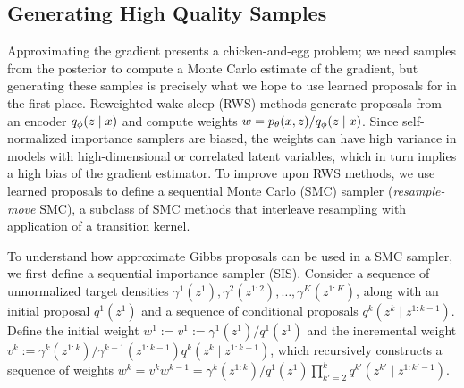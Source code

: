 \documentclass[anonymous=false, %
               format=acmsmall, %
               review=true, %
               screen=true, %
               nonacm=true]{acmart}
\theoremstyle{definition}
\begin{document}
\subsection{Generating High Quality Samples}
Approximating the gradient presents a chicken-and-egg problem; we need samples from the posterior to compute a Monte Carlo estimate of the gradient, but generating these samples is precisely what we hope to use learned proposals for in the first place. 
Reweighted wake-sleep (RWS) methods \cite{le2019revisiting} generate proposals from an encoder $q_\phi(z \mid x)$ and compute weights $w = p_\theta(x, z) / q_\phi(z \mid x)$. Since self-normalized importance samplers are biased, the weights can have high variance in models with high-dimensional or correlated latent variables, which in turn implies a high bias of the gradient estimator. To improve upon RWS methods, we use learned proposals to define a sequential Monte Carlo (SMC) sampler \cite{delmoral2006sequential} (\emph{resample-move} SMC), a subclass of SMC methods \cite{doucet2001sequential} that interleave resampling with application of a transition kernel.


To understand how approximate Gibbs proposals can be used in a SMC sampler, we first define a sequential importance sampler (SIS). Consider a sequence of unnormalized target densities $\gamma^1(z^1), \gamma^2(z^{1:2}), \dots, \gamma^K(z^{1:K})$, along with an initial proposal $q^1(z^1)$ and a sequence of conditional proposals $q^k(z^k \mid z^{1:k-1})$. Define the initial weight $w^1 := v^1 := \gamma^1(z^1) / q^1(z^1)$ and the incremental weight $v^k:=  \gamma^k(z^{1:k}) / \gamma^{k-1}(z^{1:k-1}) q^k(z^k \mid z^{1:k-1})$, which recursively constructs a sequence of weights $w^k = v^k w^{k-1}= \gamma^k(z^{1:k}) / q^1(z^1) \prod_{k'=2}^k q^{k'}(z^{k'} \mid z^{1:k'-1})$.
\end{document}

